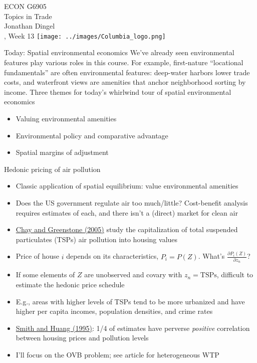 \documentclass[11pt,notes=hide,aspectratio=169]{beamer}
\begin{document}
\begin{frame}[plain]
\begin{center}
\large
\textcolor{columbiadarkblue}{ECON G6905\\
Topics in Trade\\ 
Jonathan Dingel\\
\semester, Week 13}
\vfill 
\texttt{[image: ../images/Columbia\_logo.png]}
\end{center}
\end{frame}
\begin{frame}{Today: Spatial environmental economics}
We've already seen environmental features play various roles in this course.
For example, 
first-nature ``locational fundamentals'' are often environmental features:
deep-water harbors lower trade costs,
and
waterfront views are amenities that anchor neighborhood sorting by income.
\vspace{1cm}
Three themes for today's whirlwind tour of spatial environmental economics
\begin{itemize}
	\item Valuing environmental amenities
	\item Environmental policy and comparative advantage
	\item Spatial margins of adjustment 
\end{itemize}
\end{frame}
\begin{frame}{Hedonic pricing of air pollution}
\begin{itemize}
\item Classic application of spatial equilibrium: value environmental amenities
\item Does the US government regulate air too much/little? Cost-benefit analysis requires estimates of each, and there isn't a (direct) market for clean air
\item \href{https://doi.org/10.1086/427462}{Chay and Greenstone (2005)} study the capitalization of total suspended particulates (TSPs) air pollution into housing values
\item Price of house $i$ depends on its characteristics, $P_i = P(Z)$. What's $\frac{\partial P_i(Z)}{\partial z_n}$?
\item If some elements of $Z$ are unobserved and covary with $z_n = \text{TSPs}$, difficult to estimate the hedonic price schedule
\item E.g., areas with higher levels of TSPs tend to be more urbanized and have higher per capita incomes, population densities, and crime rates
\item \href{https://doi.org/10.1086/261981}{Smith and Huang (1995)}: 1/4 of estimates have perverse \textit{positive} correlation between housing prices and pollution levels
\item I'll focus on the OVB problem; see article for heterogeneous WTP
\end{itemize}
\end{frame}
\end{document}
